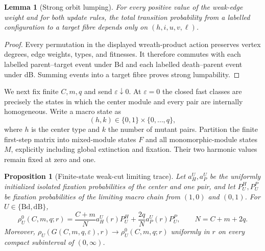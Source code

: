 \documentclass[11pt]{article}
\newtheorem{proposition}[theorem]{Proposition}
\newtheorem{lemma}[theorem]{Lemma}
\theoremstyle{definition}
\theoremstyle{remark}
\newcommand{\Bd}{\mathrm{Bd}}
\newcommand{\dB}{\mathrm{dB}}
\newcommand{\eps}{\varepsilon}
\begin{document}
\begin{lemma}[Strong orbit lumping]
\label{lem:lumping}
For every positive value of the weak-edge weight and for both update rules,
the total transition probability from a labelled configuration to a target
fibre depends only on $(h,i,u,v,\ell)$.
\end{lemma}

\begin{proof}
Every permutation in the displayed wreath-product action preserves vertex
degrees, edge weights, types, and fitnesses.  It therefore commutes with each
labelled parent--target event under Bd and each labelled death--parent event
under dB.  Summing events into a target fibre proves strong lumpability.
\end{proof}

We next fix finite $C,m,q$ and send $\eps\downarrow0$.  At $\eps=0$ the
closed fast classes are precisely the states in which the center module and
every pair are internally homogeneous.  Write a macro state as
\[
 (h,k)\in\{0,1\}\times\{0,\ldots,q\},
\]
where $h$ is the center type and $k$ the number of mutant pairs.  Partition
the finite first-step matrix into mixed-module states $F$ and all
monomorphic-module states $M$, explicitly including global extinction and
fixation.  Their two harmonic values remain fixed at zero and one.

\begin{proposition}[Finite-state weak-cut limiting trace]
\label{prop:weak-trace}
Let $a_H^U,a_P^U$ be the uniformly initialized isolated fixation
probabilities of the center and one pair, and let $P_U^H,P_U^P$ be fixation
probabilities of the limiting macro chain from $(1,0)$ and $(0,1)$.  For
$U\in\{\Bd,\dB\}$,
\begin{equation}
 \rho_U^0(C,m,q;r)
 =\frac{C+m}{N}a_H^U(r)P_U^H
 +\frac{2q}{N}a_P^U(r)P_U^P,
 \qquad N=C+m+2q.
\label{eq:finite-trace}
\end{equation}
Moreover, $\rho_U(G(C,m,q,\eps),r)\to\rho_U^0(C,m,q;r)$ uniformly in $r$
on every compact subinterval of $(0,\infty)$.
\end{proposition}
\end{document}
